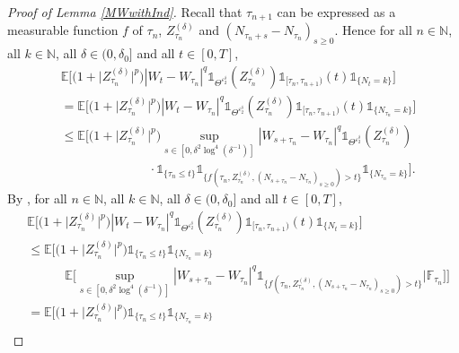 \documentclass[11pt,a4paper]{article}
\numberwithin{equation}{section}
\theoremstyle{definition}
\newcommand{\E}{{\mathbb{E}}}
\newcommand{\N}{{\mathbb{N}}}
\newcommand{\F}{\mathbb{F}}
\begin{document}
\begin{proof}[Proof of Lemma \ref{MWwithInd}]
Recall that $\tau_{n+1}$ can be expressed as a measurable function $f$ of $\tau_n$, $Z^{(\delta)}_{\tau_n}$ and $(N_{\tau_n+s} -N_{\tau_n})_{s\geq 0}$. Hence for all $n\in\N$, all $k\in\N$, all $\delta\in(0,\delta_0]$ and all $t\in[0,T]$,
\begin{equation}
    \begin{aligned}
    &\E\big[\big(1+ \big|Z^{(\delta)}_{\tau_n}\big|^p\big)   |W_t-W_{\tau_n}|^q \mathds{1}_{\Theta^{\varepsilon_2^\delta}}(Z_{\tau_n}^{(\delta)}) \mathds{1}_{[\tau_n,\tau_{n+1})}(t)  \mathds{1}_{\{N_t = k\}} \big]\\
    &= \E\big[\big(1+ \big|Z^{(\delta)}_{\tau_n}\big|^p\big)   |W_t-W_{\tau_n}|^q  \mathds{1}_{\Theta^{\varepsilon_2^\delta}}(Z_{\tau_n}^{(\delta)}) \mathds{1}_{[\tau_n,\tau_{n+1})}(t) \mathds{1}_{\{N_{\tau_n} = k\}} \big]\\
    &\leq \E\Big[\big(1+ \big|Z^{(\delta)}_{\tau_n}\big|^p\big)  \sup_{s\in[0,\delta^2\log^4(\delta^{-1})]} |W_{s+\tau_n}-W_{\tau_n}|^q \mathds{1}_{\Theta^{\varepsilon_2^\delta}}(Z_{\tau_n}^{(\delta)}) \\
    &\quad\quad\quad\quad \quad\quad\quad \cdot \mathds{1}_{\{\tau_n \leq t\}} \mathds{1}_{\{f(\tau_n,Z^{(\delta)}_{\tau_n}, (N_{s+\tau_n}-N_{\tau_n})_{s\geq 0}) > t\}} \mathds{1}_{\{N_{\tau_n} = k\}} \Big].
    \end{aligned}
\end{equation}
By \cite[p.~33]{Grikhman2004}, for all $n\in\N$, all $k\in\N$, all $\delta\in(0,\delta_0]$ and all $t\in[0,T]$,
\begin{equation}
    \begin{aligned}
    &\E\big[\big(1+ \big|Z^{(\delta)}_{\tau_n}\big|^p\big)   |W_t-W_{\tau_n}|^q \mathds{1}_{\Theta^{\varepsilon_2^\delta}}(Z_{\tau_n}^{(\delta)})  \mathds{1}_{[\tau_n,\tau_{n+1})}(t)  \mathds{1}_{\{N_t = k\}} \big]\\
    &\leq \E\Big[\big(1+ \big|Z^{(\delta)}_{\tau_n}\big|^p\big) \mathds{1}_{\{\tau_n \leq t\}} \mathds{1}_{\{N_{\tau_n} = k\}} \\
    &\quad\quad\quad \E\Big[ \sup_{s\in[0,\delta^2\log^4(\delta^{-1})]} |W_{s+\tau_n}-W_{\tau_n}|^q  \mathds{1}_{\{f(\tau_n, Z^{(\delta)}_{\tau_n}, (N_{s+\tau_n}-N_{\tau_n})_{s\geq 0})> t\}}  \Big| \F_{\tau_n} \Big] \Big] \\
    &= \E\Big[\big(1+ \big|Z^{(\delta)}_{\tau_n}\big|^p\big) \mathds{1}_{\{\tau_n \leq t\}} \mathds{1}_{\{N_{\tau_n} = k\}} \\

\end{aligned}
\end{equation}
\end{proof}
\end{document}
